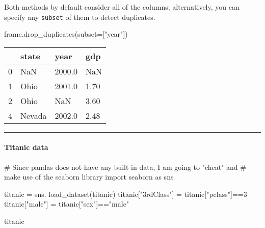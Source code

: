 \documentclass[
  letterpaper,
  DIV=11,
  numbers=noendperiod]{scrreprt}
\let\oldparagraph\paragraph
\renewcommand{\paragraph}[1]{\oldparagraph{#1}\mbox{}}
\newenvironment{Shaded}{\begin{snugshade}}{\end{snugshade}}
\newcommand{\CommentTok}[1]{\textcolor[rgb]{0.37,0.37,0.37}{#1}}
\newcommand{\DecValTok}[1]{\textcolor[rgb]{0.68,0.00,0.00}{#1}}
\newcommand{\ImportTok}[1]{\textcolor[rgb]{0.00,0.46,0.62}{#1}}
\newcommand{\NormalTok}[1]{\textcolor[rgb]{0.00,0.23,0.31}{#1}}
\newcommand{\OperatorTok}[1]{\textcolor[rgb]{0.37,0.37,0.37}{#1}}
\newcommand{\StringTok}[1]{\textcolor[rgb]{0.13,0.47,0.30}{#1}}
\begin{document}
Both methods by default consider all of the columns; alternatively, you
can specify any \texttt{subset} of them to detect duplicates.

\begin{Shaded}
\begin{Highlighting}[]
\NormalTok{frame.drop\_duplicates(subset}\OperatorTok{=}\NormalTok{[}\StringTok{"year"}\NormalTok{])}
\end{Highlighting}
\end{Shaded}

\begin{longtable}[]{@{}llll@{}}
\toprule()
& state & year & gdp \\
\midrule()
\endhead
0 & NaN & 2000.0 & NaN \\
1 & Ohio & 2001.0 & 1.70 \\
2 & Ohio & NaN & 3.60 \\
4 & Nevada & 2002.0 & 2.48 \\
\bottomrule()
\end{longtable}

\begin{center}\rule{0.5\linewidth}{0.5pt}\end{center}

\hypertarget{titanic-data-1}{%
\paragraph{Titanic data}\label{titanic-data-1}}

\begin{Shaded}
\begin{Highlighting}[]
\CommentTok{\# Since pandas does not have any built in data, I am going to "cheat" and }
\CommentTok{\# make use of the \textasciigrave{}seaborn\textasciigrave{} library}
\ImportTok{import}\NormalTok{ seaborn }\ImportTok{as}\NormalTok{ sns }

\NormalTok{titanic }\OperatorTok{=}\NormalTok{ sns. load\_dataset(}\StringTok{\textquotesingle{}titanic\textquotesingle{}}\NormalTok{)}
\NormalTok{titanic[}\StringTok{"3rdClass"}\NormalTok{] }\OperatorTok{=}\NormalTok{ titanic[}\StringTok{"pclass"}\NormalTok{]}\OperatorTok{==}\DecValTok{3}
\NormalTok{titanic[}\StringTok{"male"}\NormalTok{] }\OperatorTok{=}\NormalTok{ titanic[}\StringTok{"sex"}\NormalTok{]}\OperatorTok{==}\StringTok{"male"}

\NormalTok{titanic}
\end{Highlighting}
\end{Shaded}
\end{document}
